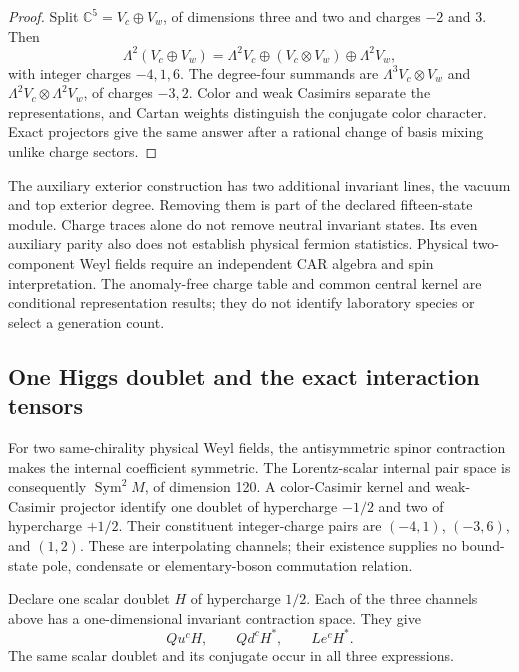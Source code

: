\begin{proof}
Split \(\mathbb C^5=V_c\oplus V_w\), of dimensions three and two and
charges \(-2\) and \(3\). Then
\[
\Lambda^2(V_c\oplus V_w)=\Lambda^2V_c\oplus(V_c\otimes V_w)
 \oplus\Lambda^2V_w,
\]
with integer charges \(-4,1,6\). The degree-four summands are
\(\Lambda^3V_c\otimes V_w\) and
\(\Lambda^2V_c\otimes\Lambda^2V_w\), of charges \(-3,2\).
Color and weak Casimirs separate the representations, and Cartan weights
distinguish the conjugate color character. Exact projectors give the same
answer after a rational change of basis mixing unlike charge sectors.
\end{proof}

The auxiliary exterior construction has two additional invariant lines, the
vacuum and top exterior degree. Removing them is part of the declared
fifteen-state module. Charge traces alone do not remove neutral invariant
states. Its even auxiliary parity also does not establish physical fermion
statistics. Physical two-component Weyl fields require an independent CAR
algebra and spin interpretation. The anomaly-free charge table and common
central kernel are conditional representation results; they do not identify
laboratory species or select a generation count.

\subsection{One Higgs doublet and the exact interaction tensors}

For two same-chirality physical Weyl fields, the antisymmetric spinor
contraction makes the internal coefficient symmetric. The Lorentz-scalar
internal pair space is consequently \(\operatorname{Sym}^2M\), of dimension
120. A color-Casimir kernel and weak-Casimir projector identify one doublet
of hypercharge \(-1/2\) and two of hypercharge \(+1/2\). Their constituent
integer-charge pairs are \((-4,1)\), \((-3,6)\), and \((1,2)\).
These are interpolating channels; their existence supplies no bound-state
pole, condensate or elementary-boson commutation relation.

\begin{proposition}
Declare one scalar doublet \(H\) of hypercharge \(1/2\). Each of the three
channels above has a one-dimensional invariant contraction space. They give
\[
 Q u^c H,\qquad Q d^c H^*,\qquad L e^c H^*.
\]
The same scalar doublet and its conjugate occur in all three expressions.
\end{proposition}


